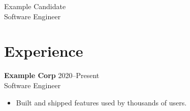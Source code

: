 \documentclass[11pt]{article}
\begin{document}
\begin{center}
{\LARGE Example Candidate}\\[0.25em]
{\large Software Engineer}
\end{center}
\section*{Experience}
\textbf{Example Corp} \hfill 2020--Present\\
Software Engineer
\begin{itemize}
  \item Built and shipped features used by thousands of users.
\end{itemize}
\end{document}
